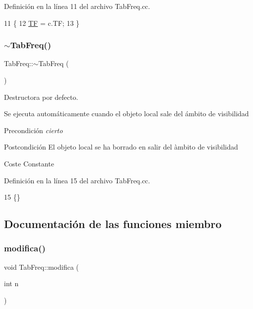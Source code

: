 Definición en la línea 11 del archivo Tab\+Freq.\+cc.


\begin{DoxyCode}
11                                 \{
12   \hyperlink{class_tab_freq_ae6be9a9671af1d897960648e10a62cfb}{TF} = c.TF;
13 \}
\end{DoxyCode}
\mbox{\label{class_tab_freq_a5e97d572cc5d1d46c6a16cf76e94c698}} 
\subsubsection{\texorpdfstring{$\sim$\+Tab\+Freq()}{~TabFreq()}}
{\footnotesize\ttfamily Tab\+Freq\+::$\sim$\+Tab\+Freq (\begin{DoxyParamCaption}{ }\end{DoxyParamCaption})}



Destructora por defecto. 

Se ejecuta automáticamente cuando el objeto local sale del ámbito de visibilidad \begin{DoxyPrecond}{Precondición}
{\itshape cierto} 
\end{DoxyPrecond}
\begin{DoxyPostcond}{Postcondición}
El objeto local se ha borrado en salir del àmbito de visibilidad 
\end{DoxyPostcond}
\begin{DoxyParagraph}{Coste}
Constante 
\end{DoxyParagraph}


Definición en la línea 15 del archivo Tab\+Freq.\+cc.


\begin{DoxyCode}
15 \{\}
\end{DoxyCode}


\subsection{Documentación de las funciones miembro}
\mbox{\label{class_tab_freq_a78f5e7e73648d2a7ecc0bd28f4cbd4c0}} 
\subsubsection{\texorpdfstring{modifica()}{modifica()}}
{\footnotesize\ttfamily void Tab\+Freq\+::modifica (\begin{DoxyParamCaption}\item[{int}]{n }\end{DoxyParamCaption})}



